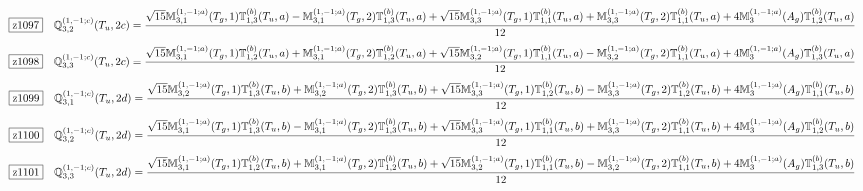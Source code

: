 \documentclass[fleqn,10pt,landscape]{jsarticle}
\begin{document}
\begin{dmath*}
\hspace*{3mm}\fbox{z1097}\quad \mathbb{Q}_{3,2}^{(1,-1;c)}(T_{u},2c)=\frac{\sqrt{15} \mathbb{M}_{3,1}^{(1,-1;a)}(T_{g},1) \mathbb{T}_{1,3}^{(b)}(T_{u},a) - \mathbb{M}_{3,1}^{(1,-1;a)}(T_{g},2) \mathbb{T}_{1,3}^{(b)}(T_{u},a) + \sqrt{15} \mathbb{M}_{3,3}^{(1,-1;a)}(T_{g},1) \mathbb{T}_{1,1}^{(b)}(T_{u},a) + \mathbb{M}_{3,3}^{(1,-1;a)}(T_{g},2) \mathbb{T}_{1,1}^{(b)}(T_{u},a) + 4 \mathbb{M}_{3}^{(1,-1;a)}(A_{g}) \mathbb{T}_{1,2}^{(b)}(T_{u},a)}{12}
\end{dmath*}
\begin{dmath*}
\hspace*{3mm}\fbox{z1098}\quad \mathbb{Q}_{3,3}^{(1,-1;c)}(T_{u},2c)=\frac{\sqrt{15} \mathbb{M}_{3,1}^{(1,-1;a)}(T_{g},1) \mathbb{T}_{1,2}^{(b)}(T_{u},a) + \mathbb{M}_{3,1}^{(1,-1;a)}(T_{g},2) \mathbb{T}_{1,2}^{(b)}(T_{u},a) + \sqrt{15} \mathbb{M}_{3,2}^{(1,-1;a)}(T_{g},1) \mathbb{T}_{1,1}^{(b)}(T_{u},a) - \mathbb{M}_{3,2}^{(1,-1;a)}(T_{g},2) \mathbb{T}_{1,1}^{(b)}(T_{u},a) + 4 \mathbb{M}_{3}^{(1,-1;a)}(A_{g}) \mathbb{T}_{1,3}^{(b)}(T_{u},a)}{12}
\end{dmath*}
\begin{dmath*}
\hspace*{3mm}\fbox{z1099}\quad \mathbb{Q}_{3,1}^{(1,-1;c)}(T_{u},2d)=\frac{\sqrt{15} \mathbb{M}_{3,2}^{(1,-1;a)}(T_{g},1) \mathbb{T}_{1,3}^{(b)}(T_{u},b) + \mathbb{M}_{3,2}^{(1,-1;a)}(T_{g},2) \mathbb{T}_{1,3}^{(b)}(T_{u},b) + \sqrt{15} \mathbb{M}_{3,3}^{(1,-1;a)}(T_{g},1) \mathbb{T}_{1,2}^{(b)}(T_{u},b) - \mathbb{M}_{3,3}^{(1,-1;a)}(T_{g},2) \mathbb{T}_{1,2}^{(b)}(T_{u},b) + 4 \mathbb{M}_{3}^{(1,-1;a)}(A_{g}) \mathbb{T}_{1,1}^{(b)}(T_{u},b)}{12}
\end{dmath*}
\begin{dmath*}
\hspace*{3mm}\fbox{z1100}\quad \mathbb{Q}_{3,2}^{(1,-1;c)}(T_{u},2d)=\frac{\sqrt{15} \mathbb{M}_{3,1}^{(1,-1;a)}(T_{g},1) \mathbb{T}_{1,3}^{(b)}(T_{u},b) - \mathbb{M}_{3,1}^{(1,-1;a)}(T_{g},2) \mathbb{T}_{1,3}^{(b)}(T_{u},b) + \sqrt{15} \mathbb{M}_{3,3}^{(1,-1;a)}(T_{g},1) \mathbb{T}_{1,1}^{(b)}(T_{u},b) + \mathbb{M}_{3,3}^{(1,-1;a)}(T_{g},2) \mathbb{T}_{1,1}^{(b)}(T_{u},b) + 4 \mathbb{M}_{3}^{(1,-1;a)}(A_{g}) \mathbb{T}_{1,2}^{(b)}(T_{u},b)}{12}
\end{dmath*}
\begin{dmath*}
\hspace*{3mm}\fbox{z1101}\quad \mathbb{Q}_{3,3}^{(1,-1;c)}(T_{u},2d)=\frac{\sqrt{15} \mathbb{M}_{3,1}^{(1,-1;a)}(T_{g},1) \mathbb{T}_{1,2}^{(b)}(T_{u},b) + \mathbb{M}_{3,1}^{(1,-1;a)}(T_{g},2) \mathbb{T}_{1,2}^{(b)}(T_{u},b) + \sqrt{15} \mathbb{M}_{3,2}^{(1,-1;a)}(T_{g},1) \mathbb{T}_{1,1}^{(b)}(T_{u},b) - \mathbb{M}_{3,2}^{(1,-1;a)}(T_{g},2) \mathbb{T}_{1,1}^{(b)}(T_{u},b) + 4 \mathbb{M}_{3}^{(1,-1;a)}(A_{g}) \mathbb{T}_{1,3}^{(b)}(T_{u},b)}{12}
\end{dmath*}
\end{document}
